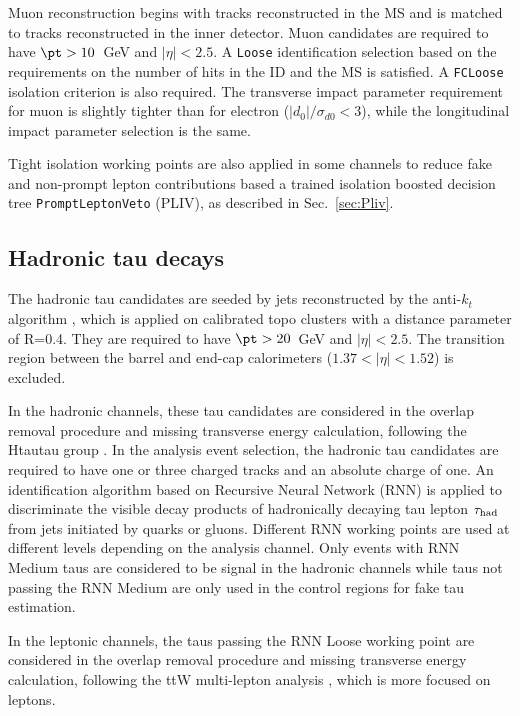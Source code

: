 Muon reconstruction begins with tracks reconstructed in the MS and is matched to tracks reconstructed in the inner detector. Muon candidates are required to have $\pt>10$~GeV and $|\eta|<2.5$. A \texttt{Loose} identification selection \cite{MuonSelectionTool} based on the requirements on the number of hits in the ID and the MS is satisfied. A \texttt{FCLoose} isolation \cite{IsolationWP} criterion is also required. The transverse impact parameter requirement for muon is slightly tighter than for electron ($|d_0|/\sigma_{d0}<3$), while the longitudinal impact
parameter selection is the same. 

Tight isolation working points are also applied in some channels to reduce fake and non-prompt lepton contributions based a trained isolation boosted decision tree \texttt{PromptLeptonVeto} 
(PLIV), as described in Sec.~\ref{sec:Pliv}.

\subsection{Hadronic tau decays}
\label{sec:taurecon}
The hadronic tau candidates \cite{tau_sys1} are seeded by jets reconstructed by the anti-$k_t$ algorithm \cite{antikt}, which is applied on calibrated topo clusters \cite{topocluster} with a distance parameter of R=0.4. They are required to have $\pt > 20$~GeV and $|\eta|<2.5$. The transition region between the barrel and end-cap calorimeters ($1.37<|\eta|<1.52$) is excluded.

In the hadronic channels, these tau candidates are considered in the overlap removal procedure and missing transverse energy calculation, following the Htautau group \cite{Htautau-note}. In the analysis event selection, the hadronic tau candidates are required to have one or three charged tracks and an absolute charge of one. An identification algorithm based on Recursive Neural Network (RNN) \cite{tau_sys2} is applied to discriminate the visible decay products of hadronically decaying tau lepton $\tau_\text{had}$ from jets initiated by quarks or gluons. Different RNN working points are used at different levels depending on the analysis channel. Only events with RNN Medium taus are considered to be signal in the hadronic channels while taus not passing the RNN Medium are only used in the control regions for fake tau estimation.

In the leptonic channels, the taus passing the RNN Loose working point are considered in the overlap removal procedure and missing transverse energy calculation, following the ttW multi-lepton analysis \cite{ttHMLgroup}, which is more focused on leptons.


